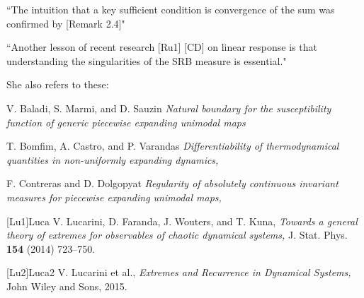 \begin{description}
``The intuition that a key sufficient condition is convergence of the sum
was confirmed by  [Remark 2.4]"

``Another lesson of recent research [Ru1] 
[CD] on linear response is that understanding the singularities of the
SRB measure is essential."

She also refers to these:


 V. Baladi, S. Marmi, and D. Sauzin
 {\it Natural boundary for the susceptibility function of generic
piecewise expanding unimodal maps}


T. Bomfim, A. Castro, and P. Varandas
\emph{Differentiability of thermodynamical quantities in
      non\--uni\-formly expanding dynamics,}


 F. Contreras and D. Dolgopyat {\it Regularity of absolutely
 continuous invariant measures for piecewise expanding unimodal maps,}


%
%


[Lu1]{Luca} V. Lucarini, D. Faranda, J. Wouters, and T. Kuna, {\it
Towards a general theory of extremes for observables of chaotic
dynamical systems,}
 J. Stat. Phys. {\bf 154} (2014) 723--750.

[Lu2]{Luca2} V. Lucarini et al., {\it Extremes and Recurrence in
Dynamical Systems,}
 John Wiley and Sons, 2015.



\end{description}
